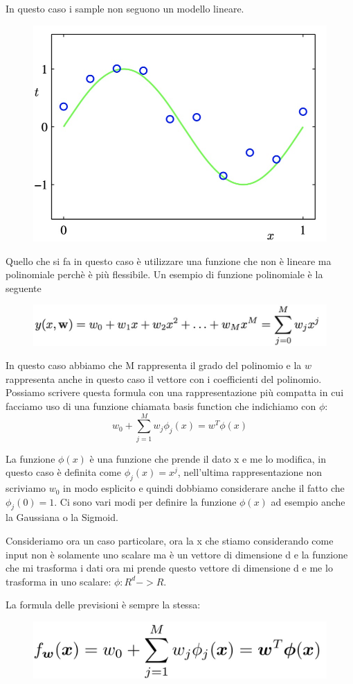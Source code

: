 \documentclass[14pt]{extreport}
\begin{document}
In questo caso i sample non seguono un modello lineare.

\begin{figure}[H]
	\centering
	\includegraphics[width=0.5\linewidth]{76.jpeg}
\end{figure}

Quello che si fa in questo caso è utilizzare una funzione che non è lineare ma polinomiale perchè è più flessibile. Un esempio di funzione polinomiale
è la seguente

\begin{figure}[H]
	\centering
	\includegraphics[width=0.7\linewidth]{77.jpeg}
\end{figure}

In questo caso abbiamo che M rappresenta il grado del polinomio e la $w$ rappresenta anche in questo caso il vettore con i coefficienti del polinomio.
Possiamo scrivere questa formula con una rappresentazione più compatta in cui facciamo uso di una funzione chiamata basis function che indichiamo con
$\phi$:
$$w_0+\sum_{j=1}^M w_j\phi_j(x) = w^T\phi(x)$$

La funzione $\phi(x)$ è una funzione che prende il dato x e me lo modifica, in questo caso è definita come $\phi_j(x) = x^j$, nell'ultima
rappresentazione non scriviamo $w_0$ in modo esplicito e quindi dobbiamo considerare anche il fatto che $\phi_j(0)=1$. Ci sono vari modi per definire
la funzione $\phi(x)$ ad esempio anche la Gaussiana o la Sigmoid.

Consideriamo ora un caso particolare, ora la x che stiamo considerando come input non è solamente uno scalare ma è un vettore di dimensione d e la
funzione che mi trasforma i dati ora mi prende questo vettore di dimensione d e me lo trasforma in uno scalare: $\phi: R^d->R$.

La formula delle previsioni è sempre la stessa:
\begin{figure}[H]
	\centering
	\includegraphics[width=0.5\linewidth]{78.jpeg}
\end{figure}
\end{document}
